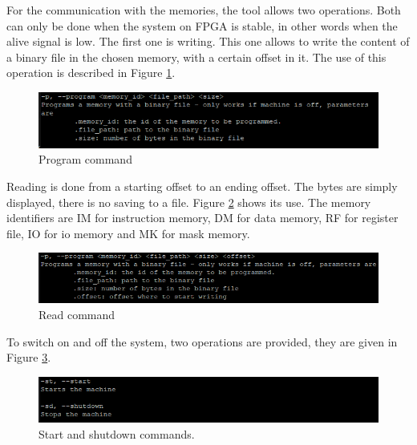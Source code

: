 For the communication with the memories, the tool allows two operations. Both can only be done 
when the system on FPGA is stable, in other words when the alive signal is low. The first one is 
writing. This one allows to write the content of a binary file in the chosen memory, with a certain 
offset in it. The use of this operation is described in Figure \ref{fig:tools/program}.

\begin{figure}[H]
    \centering
    \includegraphics[width=\linewidth]{Chapter7-Tools-Demos/res/utils_program.PNG}
    \caption{Program command}
    \label{fig:tools/program}
\end{figure}

Reading is done from a starting 
offset to an ending offset. The bytes are simply displayed, there is no saving to a file. 
Figure \ref{fig:tools/read} shows its use. The memory identifiers are IM for 
instruction memory, DM for data memory, RF for register file, IO for io memory and MK for mask 
memory.

\begin{figure}[H]
    \centering
    \includegraphics[width=\linewidth]{Chapter7-Tools-Demos/res/utils_read.PNG}
    \caption{Read command}
    \label{fig:tools/read}
\end{figure}

To switch on and off the system, two operations are provided, they are given in 
Figure \ref{fig:tools/st_sd}.

\begin{figure}[H]
    \centering
    \includegraphics[width=\linewidth]{Chapter7-Tools-Demos/res/utils_power.PNG}
    \caption{Start and shutdown commands.}
    \label{fig:tools/st_sd}
\end{figure}

